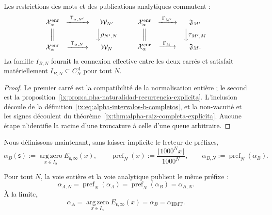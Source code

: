 \begin{proposition}
\label{ix:prop:alpha-cuadrados-compatibilidad}
Les restrictions des mots et des publications analytiques commutent :
\[
\begin{array}{ccc}
 \mathcal X_\alpha^{\mathrm{enr}}&
 \xrightarrow{\ \mathsf T_{\alpha,N'}\ }&\mathcal W_{N'}\\[1mm]
 \Big\Vert&&\Big\downarrow\rho_{N',N}\\[1mm]
 \mathcal X_\alpha^{\mathrm{enr}}&
 \xrightarrow{\ \mathsf T_{\alpha,N}\ }&\mathcal W_N
\end{array}
\qquad
\begin{array}{ccc}
 \mathcal X_\alpha^{\mathrm{enr}}&
 \xrightarrow{\ \Gamma_{M'}\ }&\mathfrak J_{M'}\\[1mm]
 \Big\Vert&&\Big\downarrow\tau_{M',M}\\[1mm]
 \mathcal X_\alpha^{\mathrm{enr}}&
 \xrightarrow{\ \Gamma_M\ }&\mathfrak J_M .
\end{array}
\]
La famille \(I_{B,N}\) fournit la connexion effective entre les deux
carrés et satisfait matériellement
\(I_{B,N}\subseteq C_N^A\) pour tout \(N\).
\end{proposition}

\begin{proof}
Le premier carré est la compatibilité de la normalisation entière ; le second est la proposition~\ref{ix:prop:alpha-naturalidad-recurrencia-explicita}. L'inclusion découle de la définition~\eqref{ix:eq:alpha-intervalos-b-completos}, et la non-vacuité et les signes découlent du théorème~\ref{ix:thm:alpha-raiz-completa-explicita}. Aucune étape n'identifie la racine d'une troncature à celle d'une queue arbitraire.
\end{proof}

Nous définissons maintenant, sans laisser implicite le lecteur de préfixes,
\begin{equation}
 \alpha_B(\mathsf s):=
 \operatorname*{arg\,zero}_{x\in I_\alpha}E_{\mathsf s,\infty}(x),
 \qquad
 \operatorname{pref}_N(x):=
 \frac{\lfloor1000^Nx\rfloor}{1000^N},
 \qquad
 \alpha_{B,N}:=\operatorname{pref}_N(\alpha_B).
 \label{ix:eq:alpha-definicion-b-y-prefijos-rev08}
\end{equation}

\begin{theorem}
\label{ix:prop:alpha-dos-limites}
Pour tout \(N\), la voie entière et la voie analytique publient le même préfixe :
\begingroup
\renewcommand{\theequation}{A7\(_0\)}
\begin{equation}
 \boxed{\alpha_{A,N}=\operatorname{pref}_N(\alpha_A)
 =\operatorname{pref}_N(\alpha_B)=\alpha_{B,N}.}
 \label{ix:eq:alpha-dos-vias-cada-nivel}
\end{equation}
\endgroup
À la limite,
\begingroup
\renewcommand{\theequation}{A8\(_0\)}
\begin{equation}
 \boxed{\alpha_A
 =\operatorname*{arg\,zero}_{x\in I_\alpha}
       E_{\mathsf s,\infty}(x)
 =\alpha_B=\alpha_{\mathrm{HMT}}.}
 \label{ix:eq:alpha-dos-vias-limite-coinductivo}
\end{equation}
\endgroup
\end{theorem}

